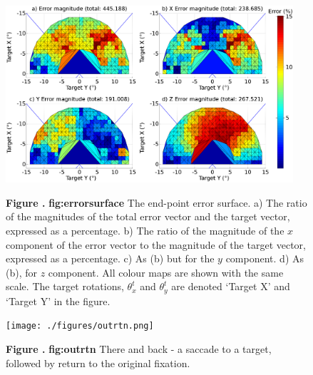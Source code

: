 \documentclass{frontiersSCNS}
\begin{document}
\begin{figure}[htb!]
\begin{center}
\includegraphics[width=0.95\textwidth]{./figures/errorsurface_percent.png}
\end{center}
\textbf{\label{fig:errorsurface} Figure .}
{ \textbf{fig:errorsurface} The end-point error surface. a) The 
ratio of the magnitudes of the total error vector and the target 
vector, expressed as a percentage. b) The ratio of the magnitude
of the $x$ component of the error vector to the magnitude of the
target vector, expressed as a percentage. c) As (b) but for the
$y$ component. d) As (b), for $z$ component. All colour maps are
shown with the same scale. The target rotations, $\theta_{x}^t$ and
$\theta_{y}^t$ are denoted `Target X' and `Target Y' in the figure.}
\end{figure}

\begin{figure}[htb!]
\begin{center}
\texttt{[image: ./figures/outrtn.png]}
\end{center}
\textbf{\label{fig:outrtn} Figure .}
{ \textbf{fig:outrtn} There and back - a saccade to a target, followed by return to the original fixation.}
\end{figure}
\end{document}
